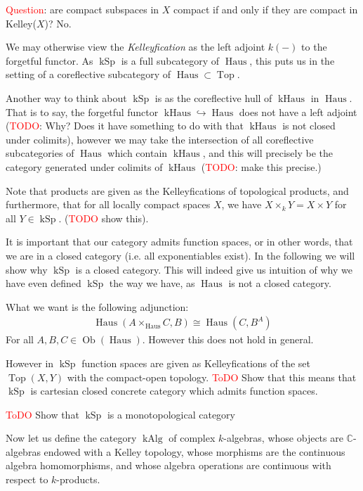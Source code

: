 \documentclass[12pt,a4paper]{article}
\DeclareMathOperator{\Top}{Top}
\DeclareMathOperator{\Ob}{Ob}
\DeclareMathOperator{\kSp}{kSp}
\DeclareMathOperator{\kHaus}{kHaus}
\DeclareMathOperator{\Haus}{Haus}
\DeclareMathOperator{\kAlg}{kAlg}
\begin{document}
\textcolor{red}{Question}: are compact subspaces in $X$ compact if and only if they are compact in Kelley($X$)? No.

We may otherwise view the \emph{Kelleyfication} as the left adjoint $k(-)$ to the forgetful functor. As $\kSp$ is a full subcategory of $\Haus$, this puts us in the setting of a coreflective subcategory of $\Haus \subset \Top$. 

Another way to think about $\kSp$ is as the coreflective hull of $\kHaus$ in $\Haus$. That is to say, the forgetful functor $\kHaus \hookrightarrow \Haus$ does not have a left adjoint (\textcolor{red}{TODO}: Why? Does it have something to do with that $\kHaus$ is not closed under colimits), however we may take the intersection of all coreflective subcategories of $\Haus$ which contain $\kHaus$, and this will precisely be the category generated under colimits of $\kHaus$  (\textcolor{red}{TODO}: make this precise.)

Note that products are given as the Kelleyfications of topological  products, and furthermore, that for all locally compact spaces $X$, we have $X \times_k Y = X \times Y$ for all $Y \in \kSp$. (\textcolor{red}{TODO} show this).

It is important that our category admits function spaces, or in other words, that we are in a closed category (i.e. all exponentiables exist). In the following we will show why $\kSp$ is a closed category. This will indeed give us intuition of why we have even defined $\kSp$ the way we have, as $\Haus $ is not a closed category.  

What we want is the following adjunction:
\begin{align*}
	\Haus(A \times_{\Haus}C, B) \cong \Haus(C, B^A)
\end{align*}
For all $A, B, C \in \Ob(\Haus)$. However this does not hold in general. 

However in $\kSp$ function spaces are given as Kelleyfications of the set $\Top(X,Y)$ with the compact-open topology. 
\textcolor{red}{ToDO} Show that this means that $\kSp$ is cartesian closed concrete category which admits function spaces.

\textcolor{red}{ToDO} Show that $\kSp$ is a monotopological category

Now let us define the category $\kAlg$ of complex $k$-algebras, whose objects are $\mathbb{C}$-algebras endowed with a Kelley topology, whose morphisms are the continuous algebra homomorphisms, and whose algebra operations are continuous with respect to $k$-products. 
\end{document}
